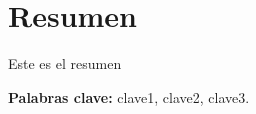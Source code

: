 \chapter{Resumen}

Este es el resumen

\vfill
\noindent \textbf{Palabras clave:} clave1, clave2, clave3.
